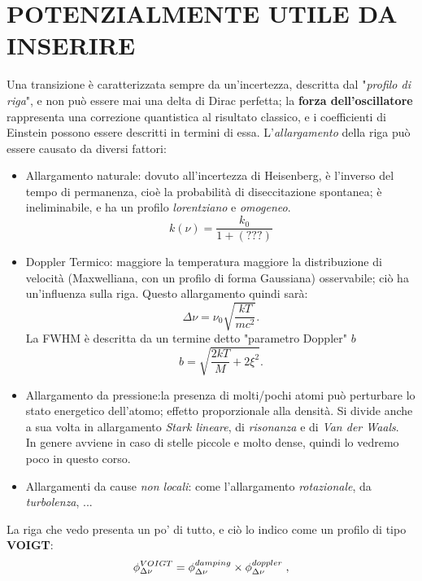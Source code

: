 \section{POTENZIALMENTE UTILE DA INSERIRE}
Una transizione è caratterizzata sempre da un'incertezza, descritta dal "\textit{profilo di riga}", e non può essere mai una delta di Dirac perfetta; la \textbf{forza dell'oscillatore} rappresenta una correzione quantistica al risultato classico, e i coefficienti di Einstein possono essere descritti in termini di essa.
L'\textit{allargamento} della riga può essere causato da diversi fattori:
\begin{itemize}
    \item Allargamento naturale: dovuto all'incertezza di Heisenberg, è l'inverso del tempo di permanenza, cioè la probabilità di diseccitazione spontanea; è ineliminabile, e ha un profilo \textit{lorentziano} e \textit{omogeneo}.
    \begin{equation}
        k(\nu) = \frac{k_{0}}{1 + \left(???\right)}
    \end{equation}
    \item Doppler Termico: maggiore la temperatura maggiore la distribuzione di velocità (Maxwelliana, con un profilo di forma Gaussiana) osservabile; ciò ha un'influenza sulla riga.
    Questo allargamento quindi sarà:
    \begin{equation}
        \Delta\nu = \nu_{0}\sqrt{\frac{kT}{mc^{2}}}.
    \end{equation}
    La FWHM è descritta da un termine detto "parametro Doppler" $b$
    \begin{equation}
        b = \sqrt{\frac{2kT}{M} + 2\xi^{2}}.
    \end{equation}
    \item Allargamento da pressione:la presenza di molti/pochi atomi può perturbare lo stato energetico dell'atomo; effetto proporzionale alla densità. Si divide anche a sua volta in allargamento \textit{Stark lineare}, di \textit{risonanza} e di \textit{Van der Waals}.\\
    In genere avviene in caso di stelle piccole e molto dense, quindi lo vedremo poco in questo corso.
    \item Allargamenti da cause \textit{non locali}: come l'allargamento \textit{rotazionale}, da \textit{turbolenza}, ...\\
\end{itemize}
La riga che vedo presenta un po' di tutto, e ciò lo indico come un profilo di tipo \textbf{VOIGT}:
\begin{equation}
    \phi^{VOIGT}_{\Delta\nu} = \phi^{damping}_{\Delta\nu} \times \phi^{doppler}_{\Delta\nu}\hspace{0.1cm},
\end{equation}
